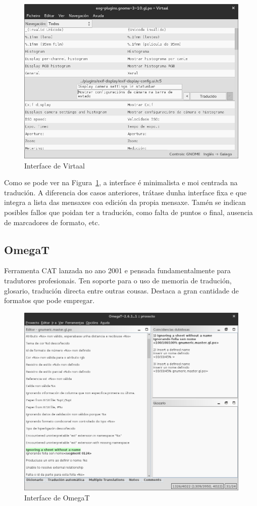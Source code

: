 \begin{figure}[h]
    \centering
    \includegraphics[width=\textwidth]{img/captura_virtaal.png}
    \caption{Interface de Virtaal}
    \label{fig:virtaal}
\end{figure}

Como se pode ver na Figura~\ref{fig:virtaal}, a interface é minimalista e moi centrada na tradución. A diferencia dos casos anteriores, trátase dunha interface fixa e que integra a lista das mensaxes coa edición da propia mensaxe. Tamén se indican posibles fallos que poidan ter a tradución, como falta de puntos o final, ausencia de marcadores de formato, etc.

\subsection{OmegaT}
Ferramenta CAT lanzada no ano 2001 e pensada fundamentalmente para tradutores profesionais. Ten soporte para o uso de memoria de tradución, glosario, tradución directa entre outras cousas. Destaca a gran cantidade de formatos que pode empregar.

\begin{figure}[h]
    \centering
    \includegraphics[width=\textwidth]{img/captura_omegat.png}
    \caption{Interface de OmegaT}
    \label{fig:omegat}
\end{figure}

